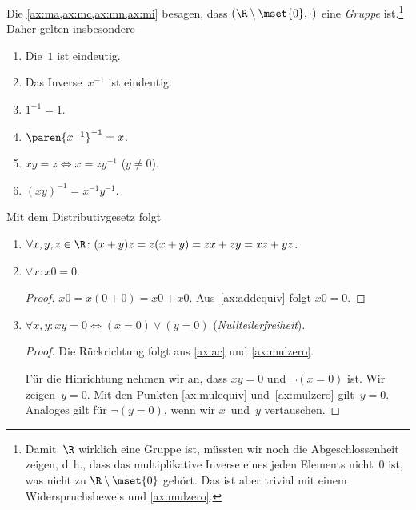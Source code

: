\documentclass[a4paper]{article}
\begin{document}
Die \cref{ax:ma,ax:mc,ax:mn,ax:mi} besagen, dass $(\R \setminus \mset{0}, \cdot)$ eine \emph{Gruppe} ist.\footnote{Damit~$\R$ wirklich eine Gruppe ist, müssten wir noch die Abgeschlossenheit zeigen, d.\,h., dass das multiplikative Inverse eines jeden Elements nicht~$0$ ist, was nicht zu $\R \setminus \mset{0}$ gehört. Das ist aber trivial mit einem Widerspruchsbeweis und \cref{ax:mulzero}.} Daher gelten insbesondere
\begin{enumerate}[(a'), leftmargin=*, widest=(m)]
    \item Die~$1$ ist eindeutig.
    \item Das Inverse~$x^{-1}$ ist eindeutig.
    \item $1^{-1} = 1$.
    \item $\paren{x^{-1}}^{-1} = x$.
    \item $x y = z \iff x = z y^{-1}$ ($y \neq 0$).\label{ax:mulequiv}
    \item $(x y)^{-1} = x^{-1} y^{-1}$.
\end{enumerate}

Mit dem Distributivgesetz folgt
\begin{enumerate}[resume*=conclusions]
    \item $\forall x,y,z \in \R\colon (x+y)z = z(x+y) = zx + zy = xz + yz$.
    \item $\forall x\colon x0 = 0$.
          \begin{proof}
              $x0 = x(0+0) = x0 + x0$. Aus~\cref{ax:addequiv} folgt $x0 = 0$.\label{ax:mulzero}
          \end{proof}
    \item $\forall x,y\colon xy = 0 \iff (x=0) \vee (y=0)$ (\emph{Nullteilerfreiheit}).
          \begin{proof}
              Die Rückrichtung folgt aus \cref{ax:ac} und \cref{ax:mulzero}.

              Für die Hinrichtung nehmen wir an, dass $xy = 0$ und $\neg (x = 0)$ ist. Wir zeigen~$y = 0$. Mit den Punkten \ref{ax:mulequiv} und~\ref{ax:mulzero} gilt~$y = 0$. Analoges gilt für $\neg (y = 0)$, wenn wir $x$~und~$y$ vertauschen.
          \end{proof}
\end{enumerate}
\end{document}
